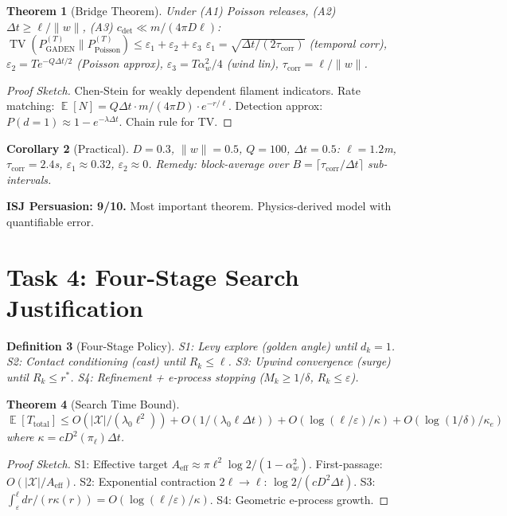 \documentclass[11pt]{article}
\newtheorem{theorem}{Theorem}
\newtheorem{corollary}[theorem]{Corollary}
\newtheorem{definition}[theorem]{Definition}
\DeclareMathOperator{\E}{\mathbb{E}}
\DeclareMathOperator{\TV}{\mathrm{TV}}
\begin{document}
\begin{theorem}[Bridge Theorem]\label{thm:bridge}
Under (A1) Poisson releases, (A2) $\Delta t\geq\ell/\|w\|$, (A3) $c_{\mathrm{det}}\ll m/(4\pi D\ell)$:
$\TV(P_{\mathrm{GADEN}}^{(T)}\|P_{\mathrm{Poisson}}^{(T)})\leq\varepsilon_1+\varepsilon_2+\varepsilon_3$
$\varepsilon_1=\sqrt{\Delta t/(2\tau_{\mathrm{corr}})}$ (temporal corr), $\varepsilon_2=Te^{-Q\Delta t/2}$ (Poisson approx), $\varepsilon_3=T\alpha_w^2/4$ (wind lin), $\tau_{\mathrm{corr}}=\ell/\|w\|$.
\end{theorem}
\begin{proof}[Proof Sketch]
Chen-Stein for weakly dependent filament indicators. Rate matching: $\E[N]=Q\Delta t\cdot m/(4\pi D)\cdot e^{-r/\ell}$. Detection approx: $P(d=1)\approx 1-e^{-\lambda\Delta t}$. Chain rule for TV.
\end{proof}

\begin{corollary}[Practical]
$D=0.3$, $\|w\|=0.5$, $Q=100$, $\Delta t=0.5$: $\ell=1.2$m, $\tau_{\mathrm{corr}}=2.4$s, $\varepsilon_1\approx 0.32$, $\varepsilon_2\approx 0$.
Remedy: block-average over $B=\lceil\tau_{\mathrm{corr}}/\Delta t\rceil$ sub-intervals.
\end{corollary}

\medskip\noindent\textbf{ISJ Persuasion: 9/10.} Most important theorem. Physics-derived model with quantifiable error.

\newpage
\section{Task 4: Four-Stage Search Justification}

\begin{definition}[Four-Stage Policy]
S1: Levy explore (golden angle) until $d_k=1$.
S2: Contact conditioning (cast) until $R_k\leq\ell$.
S3: Upwind convergence (surge) until $R_k\leq r^*$.
S4: Refinement + e-process stopping ($M_k\geq 1/\delta$, $R_k\leq\varepsilon$).
\end{definition}

\begin{theorem}[Search Time Bound]\label{thm:4stage}
$\boxed{\E[T_{\mathrm{total}}]\leq O(|\mathcal{X}|/(\lambda_0\ell^2))+O(1/(\lambda_0\ell\Delta t))+O(\log(\ell/\varepsilon)/\kappa)+O(\log(1/\delta)/\kappa_e)}$
where $\kappa=cD^2(\pi_\ell)\Delta t$.
\end{theorem}
\begin{proof}[Proof Sketch]
S1: Effective target $A_{\mathrm{eff}}\approx\pi\ell^2\log 2/(1-\alpha_w^2)$. First-passage: $O(|\mathcal{X}|/A_{\mathrm{eff}})$.
S2: Exponential contraction $2\ell\to\ell$: $\log 2/(cD^2\Delta t)$.
S3: $\int_\varepsilon^\ell dr/(r\kappa(r))=O(\log(\ell/\varepsilon)/\kappa)$.
S4: Geometric e-process growth.
\end{proof}
\end{document}
